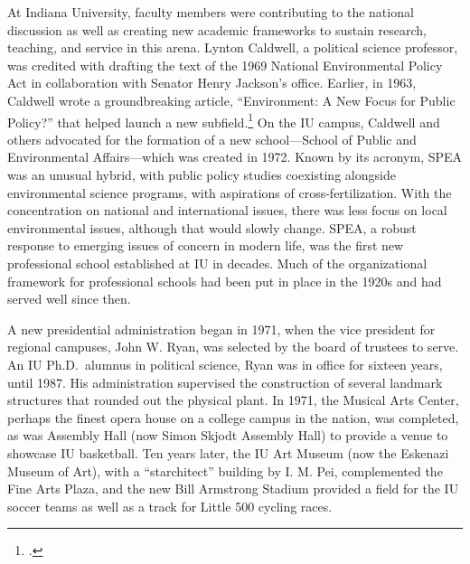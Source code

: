 \documentclass[
  american,
  letterpaper,
]{scrreprt}
\begin{document}
At Indiana University, faculty members were contributing to the national
discussion as well as creating new academic frameworks to sustain
research, teaching, and service in this arena. Lynton Caldwell, a
political science professor, was credited with drafting the text of the
1969 National Environmental Policy Act in collaboration with Senator
Henry Jackson's office. Earlier, in 1963, Caldwell wrote a
groundbreaking article, ``Environment: A New Focus for Public Policy?''
that helped launch a new subfield.\footnote{.} On the IU
campus, Caldwell and others advocated for the formation of a new
school---School of Public and Environmental Affairs---which was created
in 1972. Known by its acronym, SPEA was an unusual hybrid, with public
policy studies coexisting alongside environmental science programs, with
aspirations of cross-fertilization. With the concentration on national
and international issues, there was less focus on local environmental
issues, although that would slowly change. SPEA, a robust response to
emerging issues of concern in modern life, was the first new
professional school established at IU in decades. Much of the
organizational framework for professional schools had been put in place
in the 1920s and had served well since then.

A new presidential administration began in 1971, when the vice president
for regional campuses, John W. Ryan, was selected by the board of
trustees to serve. An IU Ph.D.~alumnus in political science, Ryan was in
office for sixteen years, until 1987. His administration supervised the
construction of several landmark structures that rounded out the
physical plant. In 1971, the Musical Arts Center, perhaps the finest
opera house on a college campus in the nation, was completed, as was
Assembly Hall (now Simon Skjodt Assembly Hall) to provide a venue to
showcase IU basketball. Ten years later, the IU Art Museum (now the
Eskenazi Museum of Art), with a ``starchitect'' building by I. M. Pei,
complemented the Fine Arts Plaza, and the new Bill Armstrong Stadium
provided a field for the IU soccer teams as well as a track for Little
500 cycling races.
\end{document}
